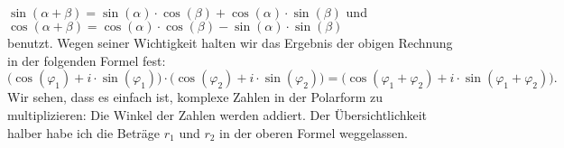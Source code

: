 \\[0.2cm]
\hspace*{1.3cm}
$\sin(\alpha + \beta) = \sin(\alpha) \cdot \cos(\beta) + \cos(\alpha) \cdot \sin(\beta)$ \quad und
\\[0.2cm]
\hspace*{1.3cm}
$\cos(\alpha + \beta) = \cos(\alpha) \cdot \cos(\beta) - \sin(\alpha) \cdot \sin(\beta)$
\\[0.2cm]
benutzt.   Wegen seiner Wichtigkeit halten wir das Ergebnis der obigen Rechnung in der folgenden Formel
fest:
\begin{equation}
  \label{eq:komplex_mult2}
  \bigl(\cos(\varphi_1) + i \cdot \sin(\varphi_1)\bigr) \cdot
  \bigl(\cos(\varphi_2) + i \cdot \sin(\varphi_2)\bigr)       
= \bigl(\cos(\varphi_1 + \varphi_2) + i \cdot \sin(\varphi_1 + \varphi_2) \bigr).
\end{equation}
Wir sehen, dass es einfach ist, komplexe Zahlen in der Polarform zu
multiplizieren: Die Winkel der Zahlen werden addiert.  Der Übersichtlichkeit halber habe ich
die Beträge $r_1$ und $r_2$ in der oberen Formel weggelassen.  

